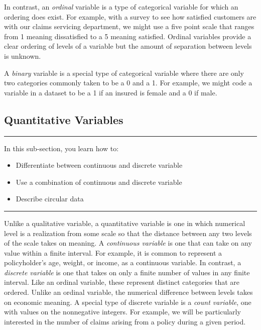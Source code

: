 \documentclass[]{book}
\providecommand{\tightlist}{%
  \setlength{\itemsep}{0pt}\setlength{\parskip}{0pt}}
\theoremstyle{definition}
\theoremstyle{definition}
\theoremstyle{definition}
\theoremstyle{remark}
\begin{document}
In contrast, an \emph{ordinal} variable is a type of categorical
variable for which an ordering does exist. For example, with a survey to
see how satisfied customers are with our claims servicing department, we
might use a five point scale that ranges from 1 meaning dissatisfied to
a 5 meaning satisfied. Ordinal variables provide a clear ordering of
levels of a variable but the amount of separation between levels is
unknown.

A \emph{binary} variable is a special type of categorical variable where
there are only two categories commonly taken to be a 0 and a 1. For
example, we might code a variable in a dataset to be a 1 if an insured
is female and a 0 if male.

\subsection{Quantitative Variables}\label{S:QuanVar}

\begin{center}\rule{0.5\linewidth}{\linethickness}\end{center}

In this sub-section, you learn how to:

\begin{itemize}
\tightlist
\item
  Differentiate between continuous and discrete variable
\item
  Use a combination of continuous and discrete variable
\item
  Describe circular data
\end{itemize}

\begin{center}\rule{0.5\linewidth}{\linethickness}\end{center}

Unlike a qualitative variable, a quantitative variable is one in which
numerical level is a realization from some scale so that the distance
between any two levels of the scale takes on meaning. A \emph{continuous
variable} is one that can take on any value within a finite interval.
For example, it is common to represent a policyholder's age, weight, or
income, as a continuous variable. In contrast, a \emph{discrete
variable} is one that takes on only a finite number of values in any
finite interval. Like an ordinal variable, these represent distinct
categories that are ordered. Unlike an ordinal variable, the numerical
difference between levels takes on economic meaning. A special type of
discrete variable is a \emph{count variable}, one with values on the
nonnegative integers. For example, we will be particularly interested in
the number of claims arising from a policy during a given period.
\end{document}
